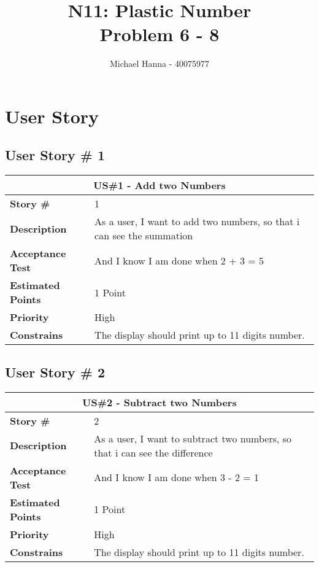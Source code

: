 \documentclass{report}
\title{N11: Plastic Number
\\ Problem 6 - 8}
\author{Michael Hanna - 40075977}
\date{}
\begin{document}
\maketitle
\tableofcontents
\listoftables
\chapter{User Story}
\section{User Story \# 1}
\begin{tabular}{|p{3cm}|p{9cm}| }
\hline
\multicolumn{2}{|c|}{US\#1 - Add two Numbers}\\
\hline
\textbf {Story \#}& 1\\
\hline
\textbf{Description}& As a user, I want to add two numbers, so that i can see the summation\\
\hline
\textbf{Acceptance Test}&And I know I am done when 2 + 3 = 5\\
\hline
\textbf{Estimated Points} & 1 Point\\
\hline
\textbf{Priority} & High \\
\hline
\textbf{Constrains}& The display should print up to 11 digits number. \\
\hline
\end{tabular}
\section{User Story \# 2}

\begin{tabular}{|p{3cm}|p{9cm}| }
\hline
\multicolumn{2}{|c|}{US\#2 - Subtract two Numbers} \\
\hline
\textbf {Story \#}& 2\\
\hline
\textbf{Description}& As a user, I want to subtract two numbers, so that i can see the difference\\
\hline
\textbf{Acceptance Test}&And I know I am done when 3 - 2 = 1\\
\hline
\textbf{Estimated Points} & 1 Point \\
\hline
\textbf{Priority} & High \\
\hline
\textbf{Constrains}& The display should print up to 11 digits number. \\
\hline
\end{tabular}
\end{document}
